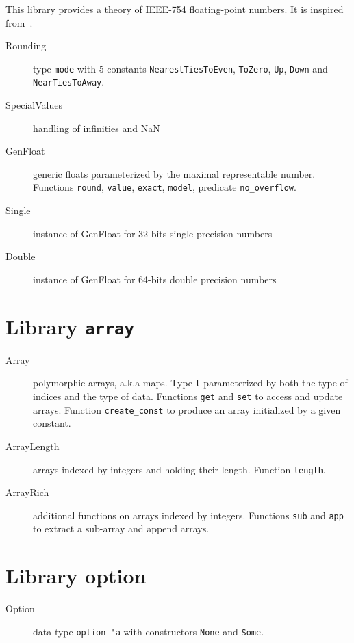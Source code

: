 This library provides a theory of IEEE-754 floating-point numbers. It
is inspired from~\cite{ayad10ijcar}.

\begin{description}
\item[Rounding] type \verb|mode| with 5 constants
  \verb|NearestTiesToEven|, \verb|ToZero|, \verb|Up|, \verb|Down| and
  \verb|NearTiesToAway|.
\item[SpecialValues] handling of infinities and NaN
\item[GenFloat] generic floats parameterized by the maximal
  representable number. Functions \verb|round|, \verb|value|,
  \verb|exact|, \verb|model|, predicate \verb|no_overflow|.
\item[Single] instance of GenFloat for 32-bits single precision numbers
\item[Double] instance of GenFloat for 64-bits double precision numbers
\end{description}


\section{Library \texttt{array}}

\begin{description}

\item[Array] polymorphic arrays, a.k.a maps. Type \verb|t|
  parameterized by both the type of indices and the type of
  data. Functions \verb|get| and \verb|set| to access and update
  arrays. Function \verb|create_const| to produce an array initialized
  by a given constant.

\item[ArrayLength] arrays indexed by integers and holding their
  length. Function \verb|length|.

\item[ArrayRich] additional functions on arrays indexed by
  integers. Functions \verb|sub| and \verb|app| to extract a sub-array
  and append arrays.

\end{description}

\section{Library option}

\begin{description}
\item[Option] data type \verb|option 'a| with constructors \verb|None| and
  \verb|Some|.
\end{description}


